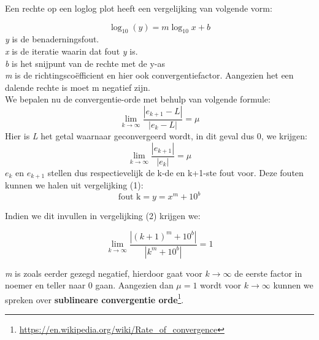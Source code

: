 \documentclass[11pt,a4paper]{article}
\begin{document}
Een rechte op een loglog plot heeft een vergelijking van volgende vorm:

\begin{equation}
\log_{10}(y) = m\log_{10}x + b 
\end{equation}
\textit{y} is de benaderningsfout.\\
\textit{x} is de iteratie waarin dat fout \textit{y} is.\\
\textit{b} is het snijpunt van de rechte met de y-as \\
\textit{m} is de richtingscoëfficient en hier ook convergentiefactor. Aangezien het een dalende rechte is moet m negatief zijn.\\
We bepalen nu de convergentie-orde met behulp van volgende formule:
$$\lim_{k\rightarrow\infty} \frac{|e_{k+1} - L|}{|e_k - L|} = \mu$$
Hier is \textit{L} het getal waarnaar geconvergeerd wordt, in dit geval dus 0, we krijgen:
\begin{equation}
\lim_{k\rightarrow\infty} \frac{|e_{k+1}|}{|e_k|} = \mu
\end{equation}
$e_k$ en $e_{k+1}$ stellen dus respectievelijk de k-de en k+1-ste fout voor. Deze fouten kunnen we halen uit vergelijking (1):
$$\text{fout k} = y = x^m + 10^b$$

Indien we dit invullen in vergelijking (2) krijgen we:

$$\lim_{k\rightarrow\infty} \frac{|(k+1)^m + 10^b|}{|k^m + 10^b|} = 1$$


\textit{m} is zoals eerder gezegd negatief, hierdoor gaat voor $k\rightarrow \infty$ de eerste factor in noemer en teller naar 0 gaan. Aangezien dan $\mu=1$ wordt voor $k\rightarrow \infty$ kunnen we spreken over \textbf{sublineare convergentie orde}\footnote{\url{https://en.wikipedia.org/wiki/Rate_of_convergence}}. 


\end{document}
